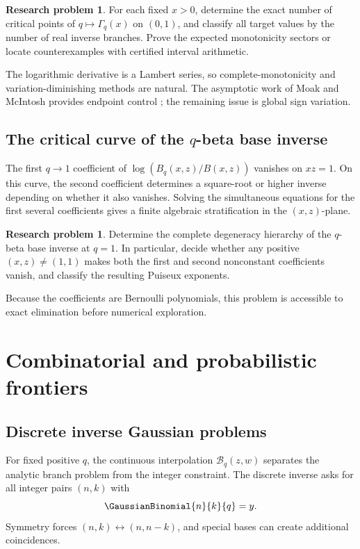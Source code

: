 \documentclass[11pt,letterpaper,oneside,openany]{book}
\theoremstyle{definition}
\newtheorem{researchproblem}[theorem]{Research problem}
\theoremstyle{remark}
\newcommand{\Bcal}{\mathcal B}
\begin{document}
\begin{researchproblem}
For each fixed \(x>0\), determine the exact number of critical points of
\(q\mapsto\Gamma_q(x)\) on \((0,1)\), and classify all target values by the
number of real inverse branches.  Prove the expected monotonicity sectors or
locate counterexamples with certified interval arithmetic.
\end{researchproblem}
The logarithmic derivative is a Lambert series, so complete-monotonicity and
variation-diminishing methods are natural.  The asymptotic work of Moak and
McIntosh provides endpoint control \cite{Moak1984,McIntosh1999}; the remaining
issue is global sign variation.

\section{The critical curve of the \texorpdfstring{\(q\)}{q}-beta base inverse}
The first \(q\to1\) coefficient of
\(\log(B_q(x,z)/B(x,z))\) vanishes on \(xz=1\).  On this curve, the second
coefficient determines a square-root or higher inverse depending on whether it
also vanishes.  Solving the simultaneous equations for the first several
coefficients gives a finite algebraic stratification in the \((x,z)\)-plane.

\begin{researchproblem}
Determine the complete degeneracy hierarchy of the \(q\)-beta base inverse at
\(q=1\).  In particular, decide whether any positive \((x,z)\ne(1,1)\) makes
both the first and second nonconstant coefficients vanish, and classify the
resulting Puiseux exponents.
\end{researchproblem}
Because the coefficients are Bernoulli polynomials, this problem is accessible
to exact elimination before numerical exploration.

\chapter{Combinatorial and probabilistic frontiers}

\section{Discrete inverse Gaussian problems}
For fixed positive \(q\), the continuous interpolation
\(\Bcal_q(z,w)\) separates the analytic branch problem from the integer
constraint.  The discrete inverse asks for all integer pairs \((n,k)\) with
\[
 \GaussianBinomial{n}{k}{q}=y.
\]
Symmetry forces \((n,k)\leftrightarrow(n,n-k)\), and special bases can create
additional coincidences.
\end{document}

